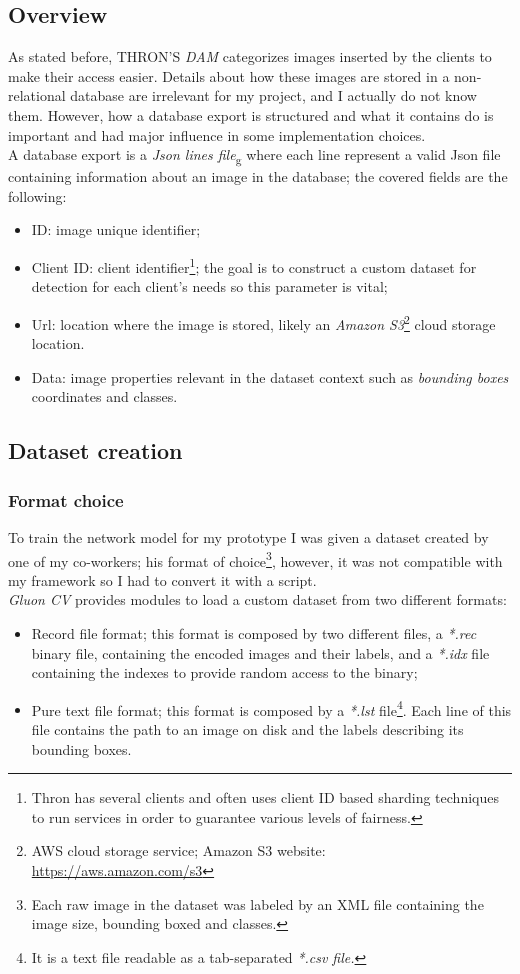 \subsection{Overview}
As stated before, THRON'S \emph{DAM} categorizes images inserted by the clients to make their access easier. Details about how these images are stored in a non-relational database are irrelevant for my project, and I actually do not know them. However, how a database export is structured and what it contains do is important and had major influence in some implementation choices. \\
A database export is a  \emph{\gls{Json lines file}}\textsubscript{g} where each line represent a valid Json file containing information about an image in the database; the covered fields are the following:
\begin{itemize}
	\item ID: image unique identifier;
	\item Client ID: client identifier\footnote{Thron has several clients and often uses client ID based sharding techniques to run services in order to guarantee various levels of fairness.}; the goal is to construct a custom dataset for detection for each client's needs so this parameter is vital;
	\item Url: location where the image is stored, likely an \emph{Amazon S3}\footnote{AWS cloud storage service; Amazon S3 website: \url{https://aws.amazon.com/s3}} cloud storage location.
	\item Data: image properties relevant in the dataset context such as \emph{bounding boxes} coordinates and classes.
\end{itemize}


\subsection{Dataset creation}

\subsubsection{Format choice}
To train the network model for my prototype I was given a dataset created by one of my co-workers; his format of choice\footnote{Each raw image in the dataset was labeled by an XML file containing the image size, bounding boxed and classes.}, however, it was not compatible with my framework so I had to convert it with a script. \\
\emph{Gluon CV} provides modules to load a custom dataset from two different formats:
\begin{itemize}
	\item Record file format; this format is composed by two different files, a \emph{*.rec} binary file, containing the encoded images and their labels, and a \emph{*.idx} file containing the indexes to provide random access to the binary;
	\item Pure text file format; this format is composed by a \emph{*.lst} file\footnote{It is a text file readable as a tab-separated \emph{*.csv file.}}. Each line of this file contains the path to an image on disk and the labels describing its bounding boxes.
\end{itemize}


